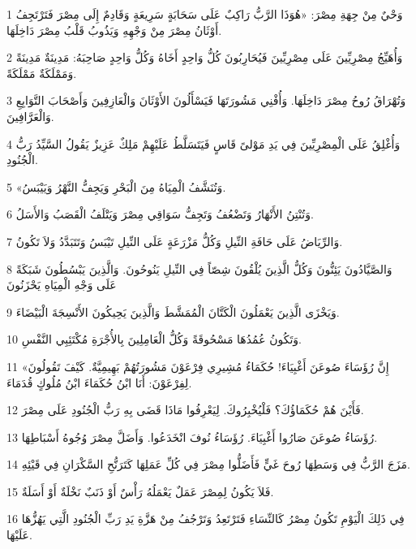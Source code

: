\par 1 وَحْيٌ مِنْ جِهَةِ مِصْرَ: «هُوَذَا الرَّبُّ رَاكِبٌ عَلَى سَحَابَةٍ سَرِيعَةٍ وَقَادِمٌ إِلَى مِصْرَ فَتَرْتَجِفُ أَوْثَانُ مِصْرَ مِنْ وَجْهِهِ وَيَذُوبُ قَلْبُ مِصْرَ دَاخِلَهَا.
\par 2 وَأُهَيِّجُ مِصْرِيِّينَ عَلَى مِصْرِيِّينَ فَيُحَارِبُونَ كُلُّ وَاحِدٍ أَخَاهُ وَكُلُّ وَاحِدٍ صَاحِبَهُ: مَدِينَةٌ مَدِينَةً وَمَمْلَكَةٌ مَمْلَكَةً.
\par 3 وَتُهْرَاقُ رُوحُ مِصْرَ دَاخِلَهَا. وَأُفْنِي مَشُورَتَهَا فَيَسْأَلُونَ الأَوْثَانَ وَالْعَازِفِينَ وَأَصْحَابَ التَّوَابِعِ وَالْعَرَّافِينَ.
\par 4 وَأُغْلِقُ عَلَى الْمِصْرِيِّينَ فِي يَدِ مَوْلىً قَاسٍ فَيَتَسَلَّطُ عَلَيْهِمْ مَلِكٌ عَزِيزٌ يَقُولُ السَّيِّدُ رَبُّ الْجُنُودِ.
\par 5 «وَتُنَشَّفُ الْمِيَاهُ مِنَ الْبَحْرِ وَيَجِفُّ النَّهْرُ وَيَيْبَسُ.
\par 6 وَتُنْتِنُ الأَنْهَارُ وَتَضْعُفُ وَتَجِفُّ سَوَاقِي مِصْرَ وَيَتْلَفُ الْقَصَبُ وَالأَسَلُ.
\par 7 وَالرِّيَاضُ عَلَى حَافَةِ النِّيلِ وَكُلُّ مَزْرَعَةٍ عَلَى النِّيلِ تَيْبَسُ وَتَتَبَدَّدُ وَلاَ تَكُونُ.
\par 8 وَالصَّيَّادُونَ يَئِنُّونَ وَكُلُّ الَّذِينَ يُلْقُونَ شِصّاً فِي النِّيلِ يَنُوحُونَ. وَالَّذِينَ يَبْسُطُونَ شَبَكَةً عَلَى وَجْهِ الْمِيَاهِ يَحْزَنُونَ
\par 9 وَيَخْزَى الَّذِينَ يَعْمَلُونَ الْكَتَّانَ الْمُمَشَّطَ وَالَّذِينَ يَحِيكُونَ الأَنْسِجَةَ الْبَيْضَاءَ.
\par 10 وَتَكُونُ عُمُدُهَا مَسْحُوقَةً وَكُلُّ الْعَامِلِينَ بِالأُجْرَةِ مُكْتَئِبِي النَّفْسِ.
\par 11 «إِنَّ رُؤَسَاءَ صُوعَنَ أَغْبِيَاءَ! حُكَمَاءُ مُشِيرِي فِرْعَوْنَ مَشُورَتُهُمْ بَهِيمِيَّةٌ. كَيْفَ تَقُولُونَ لِفِرْعَوْنَ: أَنَا ابْنُ حُكَمَاءَ ابْنُ مُلُوكٍ قُدَمَاءَ.
\par 12 فَأَيْنَ هُمْ حُكَمَاؤُكَ؟ فَلْيُخْبِرُوكَ. لِيَعْرِفُوا مَاذَا قَضَى بِهِ رَبُّ الْجُنُودِ عَلَى مِصْرَ.
\par 13 رُؤَسَاءُ صُوعَنَ صَارُوا أَغْبِيَاءَ. رُؤَسَاءُ نُوفَ انْخَدَعُوا. وَأَضَلَّ مِصْرَ وُجُوهُ أَسْبَاطِهَا.
\par 14 مَزَجَ الرَّبُّ فِي وَسَطِهَا رُوحَ غَيٍّ فَأَضَلُّوا مِصْرَ فِي كُلِّ عَمَلِهَا كَتَرَنُّحِ السَّكْرَانِ فِي قَيْئِهِ.
\par 15 فَلاَ يَكُونُ لِمِصْرَ عَمَلٌ يَعْمَلُهُ رَأْسٌ أَوْ ذَنَبٌ نَخْلَةٌ أَوْ أَسَلَةٌ.
\par 16 فِي ذَلِكَ الْيَوْمِ تَكُونُ مِصْرُ كَالنِّسَاءِ فَتَرْتَعِدُ وَتَرْجُفُ مِنْ هَزَّةِ يَدِ رَبِّ الْجُنُودِ الَّتِي يَهُزُّهَا عَلَيْهَا.
